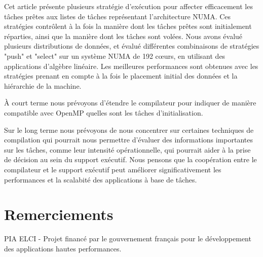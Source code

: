 \documentclass[parallelisme]{compas2016}
\begin{document}
Cet article présente plusieurs stratégie d'exécution pour affecter efficacement
les tâches prêtes aux listes de tâches représentant l'architecture NUMA.
Ces stratégies contrôlent à la fois la manière dont les tâches prêtes sont
initialement réparties, ainsi que la manière dont les tâches sont volées.
Nous avons évalué plusieurs distributions de données, et évalué différentes
combinaisons de stratégies "push" et "select" sur un système NUMA de 192 cœurs,
en utilisant des applications d'algèbre linéaire.
Les meilleures performances sont obtenues avec les stratégies prenant en compte à
la fois le placement initial des données et la hiérarchie de la machine.

À court terme nous prévoyons d'étendre le compilateur pour indiquer de manière
compatible avec OpenMP quelles sont les tâches d'initialisation.

Sur le long terme nous prévoyons de nous concentrer sur certaines techniques
de compilation qui pourrait nous permettre d'évaluer des informations
importantes sur les tâches, comme leur intensité opérationnelle, qui pourrait
aider à la prise de décision au sein du support exécutif. Nous pensons
que la coopération entre le compilateur et le support exécutif peut améliorer
significativement les performances et la scalabité des applications à base de tâches.

\vspace*{-2ex}
\section*{Remerciements}

PIA ELCI - Projet financé par le gouvernement français pour le développement
des applications hautes performances.


\end{document}
